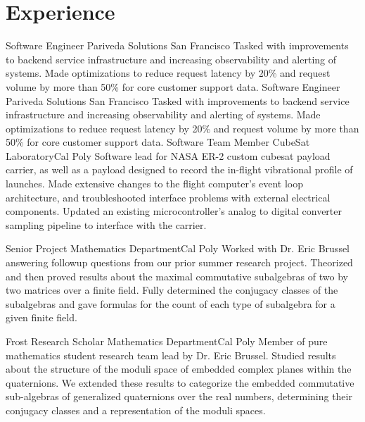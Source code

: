 \documentclass[letterpaper, 11pt, sans]{moderncv}
\begin{document}
\section{Experience}
        {Software Engineer}
        {Pariveda Solutions}
        {San Francisco}{}
        {
            Tasked with improvements to backend service infrastructure and increasing observability and alerting of systems.
            Made optimizations to reduce request latency by 20\% and request volume by more than 50\% for core customer support data.
        }
        {Software Engineer}
        {Pariveda Solutions}
        {San Francisco}{}
        {
            Tasked with improvements to backend service infrastructure and increasing observability and alerting of systems.
            Made optimizations to reduce request latency by 20\% and request volume by more than 50\% for core customer support data.
        }
        {Software Team Member}
        {CubeSat Laboratory}{Cal Poly}{}
        {
            Software lead for NASA ER-2 custom cubesat payload carrier, as well as a payload designed to record the in-flight vibrational profile of launches.
            Made extensive changes to the flight computer's event loop architecture, and troubleshooted interface problems with external electrical components.
            Updated an existing microcontroller's analog to digital converter sampling pipeline to interface with the carrier.
        }

        {Senior Project}
        {Mathematics Department}{Cal Poly}{}
        {
            Worked with Dr. Eric Brussel answering followup questions from our prior summer research project.
            Theorized and then proved results about the maximal commutative subalgebras of two by two matrices over a finite field.
            Fully determined the conjugacy classes of the subalgebras and gave formulas for the count of each type of subalgebra for a given finite field.
        }

        {Frost Research Scholar}
        {Mathematics Department}{Cal Poly}{}
        {
            Member of pure mathematics student research team lead by Dr. Eric Brussel.
            Studied results about the structure of the moduli space of embedded complex planes within the quaternions.
            We extended these results to categorize the embedded commutative sub-algebras of generalized quaternions over the real numbers, determining their conjugacy classes and a representation of the moduli spaces.
        }
\end{document}

